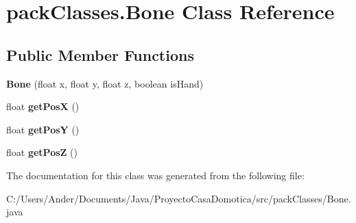 \hypertarget{classpack_classes_1_1_bone}{}\section{pack\+Classes.\+Bone Class Reference}
\label{classpack_classes_1_1_bone}
\subsection*{Public Member Functions}
\begin{DoxyCompactItemize}
\item 
\mbox{\label{classpack_classes_1_1_bone_a309f8b47e609a32b4ff5684833e21b89}} 
{\bfseries Bone} (float x, float y, float z, boolean is\+Hand)
\item 
\mbox{\label{classpack_classes_1_1_bone_aa97b6423202ae70d611e6e543b551abb}} 
float {\bfseries get\+PosX} ()
\item 
\mbox{\label{classpack_classes_1_1_bone_a0ef091c057fd11820b64e8f5a5a165e9}} 
float {\bfseries get\+PosY} ()
\item 
\mbox{\label{classpack_classes_1_1_bone_aa124e5b4a00e34b38d90cc1e044165f3}} 
float {\bfseries get\+PosZ} ()
\end{DoxyCompactItemize}


The documentation for this class was generated from the following file\+:\begin{DoxyCompactItemize}
\item 
C\+:/\+Users/\+Ander/\+Documents/\+Java/\+Proyecto\+Casa\+Domotica/src/pack\+Classes/Bone.\+java\end{DoxyCompactItemize}
